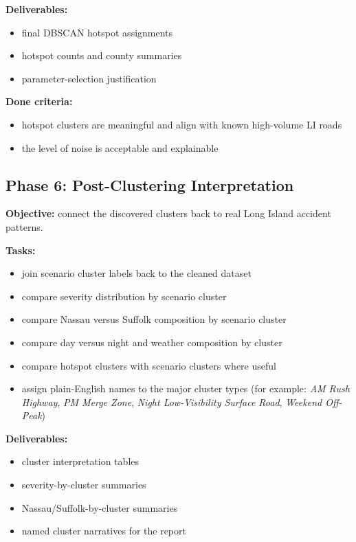 \documentclass[11pt]{article}
\begin{document}
\textbf{Deliverables:}
\begin{itemize}
\item final DBSCAN hotspot assignments
\item hotspot counts and county summaries
\item parameter-selection justification
\end{itemize}

\textbf{Done criteria:}
\begin{itemize}
\item hotspot clusters are meaningful and align with known high-volume LI roads
\item the level of noise is acceptable and explainable
\end{itemize}

\subsection{Phase 6: Post-Clustering Interpretation}

\textbf{Objective:} connect the discovered clusters back to real Long Island accident patterns.

\textbf{Tasks:}
\begin{itemize}
\item join scenario cluster labels back to the cleaned dataset
\item compare severity distribution by scenario cluster
\item compare Nassau versus Suffolk composition by scenario cluster
\item compare day versus night and weather composition by cluster
\item compare hotspot clusters with scenario clusters where useful
\item assign plain-English names to the major cluster types (for example: \textit{AM Rush Highway}, \textit{PM Merge Zone}, \textit{Night Low-Visibility Surface Road}, \textit{Weekend Off-Peak})
\end{itemize}

\textbf{Deliverables:}
\begin{itemize}
\item cluster interpretation tables
\item severity-by-cluster summaries
\item Nassau/Suffolk-by-cluster summaries
\item named cluster narratives for the report
\end{itemize}
\end{document}
